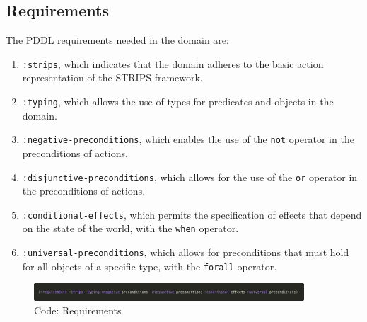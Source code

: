 \documentclass{article}
\begin{document}
\subsection{Requirements}
The PDDL requirements needed in the domain are:
\begin{enumerate}
    \item \texttt{:strips}, which indicates that the domain adheres to the basic action representation of the STRIPS framework.
    \item \texttt{:typing}, which allows the use of types for predicates and objects in the domain.
    \item \texttt{:negative-preconditions}, which enables the use of the \texttt{not} operator in the preconditions of actions.
    \item \texttt{:disjunctive-preconditions}, which allows for the use of the \texttt{or} operator in the preconditions of actions.
    \item \texttt{:conditional-effects}, which permits the specification of effects that depend on the state of the world, with the \texttt{when} operator.
    \item \texttt{:universal-preconditions}, which allows for preconditions that must hold for all objects of a specific type, with the \texttt{forall} operator.
    \end{enumerate}
\begin{figure}[ht]
    \centering
    \includegraphics[width=0.90\textwidth]{assets/requirements.png}
    \caption{Code: Requirements}
    \label{fig:req}
\end{figure}
\end{document}
